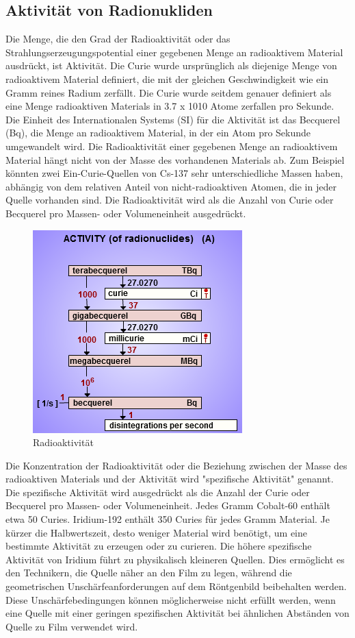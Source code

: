\subsection{Aktivität von Radionukliden}
Die Menge, die den Grad der Radioaktivität oder das Strahlungserzeugungspotential einer gegebenen Menge an radioaktivem Material ausdrückt, ist Aktivität.
Die Curie wurde ursprünglich als diejenige Menge von radioaktivem Material definiert, die mit der gleichen Geschwindigkeit wie ein Gramm reines Radium zerfällt.
Die Curie wurde seitdem genauer definiert als eine Menge radioaktiven Materials in
3.7 x 1010 Atome zerfallen pro Sekunde. Die Einheit des Internationalen Systems (SI) für die Aktivität ist das Becquerel (Bq), die Menge an radioaktivem Material, in der ein Atom pro Sekunde umgewandelt wird.
Die Radioaktivität einer gegebenen Menge an radioaktivem Material hängt nicht von der Masse des vorhandenen Materials ab.
Zum Beispiel könnten zwei Ein-Curie-Quellen von Cs-137 sehr unterschiedliche Massen haben, abhängig von dem relativen Anteil von nicht-radioaktiven Atomen, die in jeder Quelle vorhanden sind. Die Radioaktivität wird als die Anzahl von Curie oder Becquerel pro Massen- oder Volumeneinheit ausgedrückt.
\begin{figure}[htb]
  \centering  
  \includegraphics[scale=0.8]{img/activity.png}
  \caption{Radioaktivität}
  \label{fig:activity}
\end{figure}
Die Konzentration der Radioaktivität oder die Beziehung zwischen der Masse des radioaktiven Materials und der Aktivität wird "spezifische Aktivität" genannt. Die spezifische Aktivität wird ausgedrückt als die Anzahl der Curie oder Becquerel pro Massen- oder Volumeneinheit. Jedes Gramm Cobalt-60 enthält etwa 50 Curies. Iridium-192 enthält 350 Curies für jedes Gramm Material.
Je kürzer die Halbwertszeit, desto weniger Material wird benötigt, um eine bestimmte Aktivität zu erzeugen oder zu curieren.
Die höhere spezifische Aktivität von Iridium führt zu physikalisch kleineren Quellen. Dies ermöglicht es den Technikern, die Quelle näher an den Film zu legen, während die geometrischen Unschärfeanforderungen auf dem Röntgenbild beibehalten werden.
Diese Unschärfebedingungen können möglicherweise nicht erfüllt werden, wenn eine Quelle mit einer geringen spezifischen Aktivität bei ähnlichen Abständen von Quelle zu Film verwendet wird.

